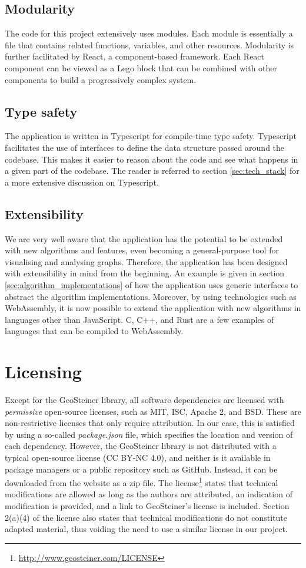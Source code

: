 \documentclass{l4proj}
\begin{document}
\subsection{Modularity}
The code for this project extensively uses modules. Each module is essentially a file that contains related functions, variables, and other resources.
Modularity is further facilitated by React, a component-based framework. Each React component can be viewed as a Lego block that can be combined with other components to build a progressively complex system.
\subsection{Type safety}
The application is written in Typescript for compile-time type safety. Typescript facilitates the use of interfaces to define the data structure passed around the codebase. This makes it easier to reason about the code and see what happens in a given part of the codebase. The reader is referred to section \ref{sec:tech_stack} for a more extensive discussion on Typescript.
\subsection{Extensibility}
We are very well aware that the application has the potential to be extended with new algorithms and features, even becoming a general-purpose tool for visualising and analysing graphs. Therefore, the application has been designed with extensibility in mind from the beginning. An example is given in section \ref{sec:algorithm_implementations} of how the application uses generic interfaces to abstract the algorithm implementations. Moreover, by using technologies such as WebAssembly, it is now possible to extend the application with new algorithms in languages other than JavaScript. C, C++, and Rust are a few examples of languages that can be compiled to WebAssembly.

\section{Licensing}
Except for the GeoSteiner library, all software dependencies are licensed with \textit{permissive} open-source licenses, such as MIT, ISC, Apache 2, and BSD. These are non-restrictive licenses that only require attribution. In our case, this is satisfied by using a so-called \textit{package.json} file, which specifies the location and version of each dependency.
However, the GeoSteiner library is not distributed with a typical open-source license (CC BY-NC 4.0), and neither is it available in package managers or a public repository such as GitHub. Instead, it can be downloaded from the website as a zip file.
The license\footnote{\url{http://www.geosteiner.com/LICENSE}} states that technical modifications are allowed as long as the authors are attributed, an indication of modification is provided, and a link to GeoSteiner's license is included. Section 2(a)(4) of the license also states that technical modifications do not constitute adapted material, thus voiding the need to use a similar license in our project.
\end{document}
